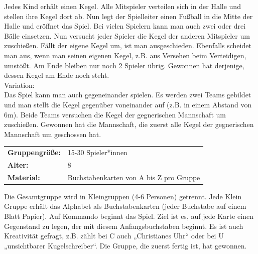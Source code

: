  Jedes Kind erhält einen Kegel. Alle Mitspieler verteilen sich in der Halle und stellen ihre Kegel dort ab. Nun legt der Spielleiter einen Fußball in die Mitte der Halle und eröffnet das Spiel. Bei vielen Spielern kann man auch zwei oder drei Bälle einsetzen. Nun versucht jeder Spieler die Kegel der anderen Mitspieler um zuschießen. Fällt der eigene Kegel um, ist man ausgeschieden. Ebenfalls scheidet man aus, wenn man seinen eigenen Kegel, z.B. aus Versehen beim Verteidigen, umstößt. Am Ende bleiben nur noch 2 Spieler übrig. Gewonnen hat derjenige, dessen Kegel am Ende noch steht.
 \\ \newline
 Variation: \\ Das Spiel kann man auch gegeneinander spielen. Es werden zwei Teams gebildet und man stellt die Kegel gegenüber voneinander auf (z.B. in einem Abstand von 6m). Beide Teams versuchen die Kegel der gegnerischen Mannschaft um zuschießen. Gewonnen hat die Mannschaft, die zuerst alle Kegel der gegnerischen Mannschaft um geschossen hat.\\


\newpage


\begin{table}[H]
\begin{tabular}{>{\bfseries}lp{8cm}}
   Gruppengröße:   & 15-30 Spieler*innen\\
    Alter: & 8 \\
    Material: & Buchstabenkarten von A bis Z pro Gruppe \\ 
\end{tabular}
\end{table} 

 Die Gesamtgruppe wird in Kleingruppen (4-6 Personen) getrennt. Jede Klein Gruppe erhält das Alphabet als Buchstabenkarten (jeder Buchstabe auf einem Blatt Papier). Auf Kommando beginnt das Spiel. Ziel ist es, auf jede Karte einen Gegenstand zu legen, der mit diesem Anfangsbuchstaben beginnt. Es ist auch Kreativität gefragt, z.B. zählt bei C auch „Christianes Uhr“ oder bei U „unsichtbarer Kugelschreiber“. Die Gruppe, die zuerst fertig ist, hat gewonnen. \\





